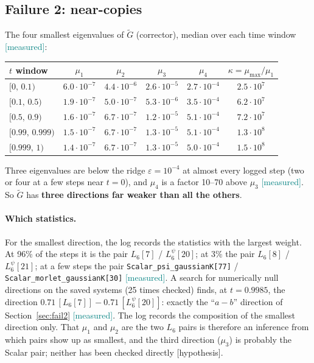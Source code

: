\documentclass[11pt,a4paper]{article}
\newcommand{\code}[1]{\texttt{#1}}
\newcommand{\meas}{\textcolor{teal}{\textsf{[measured]}}}
\newcommand{\hyp}{\textcolor{orange!80!black}{\textsf{[hypothesis]}}}
\newcommand{\Gt}{\widetilde{G}}
\begin{document}
\subsection{Failure 2: near-copies}
The four smallest eigenvalues of $\Gt$ (corrector), median over each time window \meas:
\begin{center}\small
\begin{tabular}{lccccc}
\toprule
$t$ window & $\mu_1$ & $\mu_2$ & $\mu_3$ & $\mu_4$ & $\kappa=\mu_{\max}/\mu_1$\\
\midrule
$[0,\,0.1)$     & $6.0\cdot10^{-7}$ & $4.4\cdot10^{-6}$ & $2.6\cdot10^{-5}$ & $2.7\cdot10^{-4}$ & $2.5\cdot10^{7}$\\
$[0.1,\,0.5)$   & $1.9\cdot10^{-7}$ & $5.0\cdot10^{-7}$ & $5.3\cdot10^{-6}$ & $3.5\cdot10^{-4}$ & $6.2\cdot10^{7}$\\
$[0.5,\,0.9)$   & $1.6\cdot10^{-7}$ & $6.7\cdot10^{-7}$ & $1.2\cdot10^{-5}$ & $5.1\cdot10^{-4}$ & $7.2\cdot10^{7}$\\
$[0.99,\,0.999)$& $1.5\cdot10^{-7}$ & $6.7\cdot10^{-7}$ & $1.3\cdot10^{-5}$ & $5.1\cdot10^{-4}$ & $1.3\cdot10^{8}$\\
$[0.999,\,1)$   & $1.4\cdot10^{-7}$ & $6.7\cdot10^{-7}$ & $1.3\cdot10^{-5}$ & $5.0\cdot10^{-4}$ & $1.5\cdot10^{8}$\\
\bottomrule
\end{tabular}
\end{center}
Three eigenvalues are below the ridge $\varepsilon=10^{-4}$ at almost every logged step (two or four
at a few steps near $t=0$), and $\mu_4$ is a factor 10--70 above $\mu_3$ \meas. So $\Gt$ has
\textbf{three directions far weaker than all the others}.

\paragraph{Which statistics.} For the smallest direction, the log records the statistics with the
largest weight. At 96\% of the steps it is the pair $L_6[7]$ / $L_6^\psi[20]$; at 3\% the pair
$L_6[8]$ / $L_6^\psi[21]$; at a few steps the pair \code{Scalar\_psi\_gaussianK[77]} /
\code{Scalar\_morlet\_gaussianK[30]} \meas. A search for numerically null directions on the saved
systems (25 times checked) finds, at $t=0.9985$, the direction $0.71\,[L_6[7]]-0.71\,[L_6^\psi[20]]$:
exactly the ``$a-b$'' direction of Section~\ref{sec:fail2} \meas. The log records the composition of the
smallest direction only. That $\mu_1$ and $\mu_2$ are the two $L_6$ pairs is therefore an inference from
which pairs show up as smallest, and the third direction ($\mu_3$) is probably the Scalar pair; neither
has been checked directly \hyp.
\end{document}
